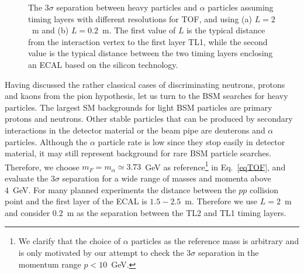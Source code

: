 \begin{figure}
\begin{center}
\end{center}
\caption{
The $3\sigma$ separation between heavy particles and $\alpha$ particles assuming timing layers with different resolutions for TOF, and using (a) $L=2$~m and (b) $L=0.2$~m.
The first value of $L$ is the typical distance
from the interaction vertex to the first layer TL1, while the second value is the typical  distance
between the two timing layers enclosing an ECAL based on the silicon technology.
}
\label{fig:signgleBSM}
\end{figure}

Having discussed the rather classical cases of discriminating  neutrons, protons and kaons from the pion hypothesis,
let us turn to the BSM searches for heavy particles.
The largest SM  backgrounds for light BSM  particles are primary protons and neutrons.
Other stable particles that can be produced by secondary interactions in the 
detector material or the beam pipe are deuterons and $\alpha$ particles. 
Although the $\alpha$ particle rate is  low since they stop easily in detector material,
it may still represent background for rare BSM particle searches.  
Therefore, we choose  $m_F=m_{\alpha}\simeq 3.73$~GeV  as reference\footnote{We clarify that the choice of $\alpha$ particles as the reference mass is
arbitrary and is only motivated by our attempt to check the $3\sigma$ separation in the momentum range $p<10$~GeV.} in  Eq.~\ref{eqTOF}, and evaluate the
$3\sigma$ separation for a wide range of masses and momenta above 4~GeV.
For many planned experiments the distance between the $pp$ collision point and the first layer of the ECAL is 
$1.5-2.5$~m. Therefore we use $L=2$~m and consider 0.2~m as the separation between the TL2 and TL1 timing layers.

